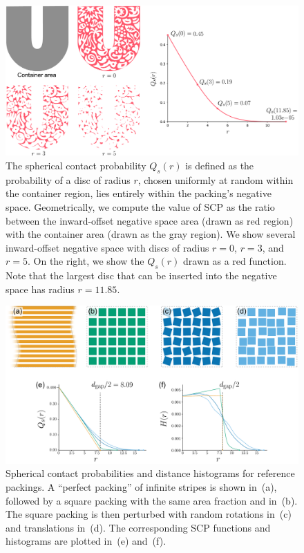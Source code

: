 \begin{figure}[t]
\centering
\includegraphics[width=1.0\textwidth]{figures/metrics/unilever_scp.pdf}
\caption[An illustration of calculating $Q_s(r)$]
{\label{fig_unilever_scp}
\nnewtext
{
    The spherical contact probability $Q_s(r)$ is defined as the probability of a 
	disc of radius $r$, chosen uniformly at random within the container region, lies entirely within the 
	packing's negative space.
	Geometrically, we compute the value of SCP as the ratio between the inward-offset negative space area (drawn as red region)
	with the container area (drawn as the gray region).
	We show several inward-offset negative space with discs of radius $r = 0$, $r = 3$, and $r = 5$.
	On the right, we show the $Q_s(r)$ drawn as a red function.
	Note that the largest disc that can be inserted into the negative space has radius $r = 11.85$.
}
}
\end{figure}

\begin{figure}[h]
\centering
\includegraphics[width=1.0\textwidth]{figures/metrics/hsr_viz_big.pdf}
\caption[Spherical contact probabilities and distance histograms \newline for reference packings]
{\label{hsr_viz}
Spherical contact probabilities and distance histograms for 
reference packings.
A ``perfect packing'' of infinite stripes is shown in~(a),
followed by a square packing with the same area fraction and 
in~(b).  The square packing is then perturbed with random rotations in~(c)
and translations in~(d). The corresponding SCP functions and histograms are plotted
in~(e) and~(f).}
\end{figure}


